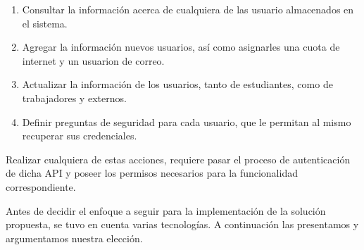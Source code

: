 \begin{enumerate}
	\item Consultar la información acerca de cualquiera de las usuario almacenados en el sistema.
	\item Agregar la información nuevos usuarios, así como asignarles una cuota de internet y un
		usuarion de correo.
	\item Actualizar la información de los usuarios, tanto de estudiantes, como de 
	trabajadores y externos.
	\item Definir preguntas de seguridad para cada usuario, que le permitan al mismo recuperar
		sus credenciales.
\end{enumerate}

Realizar cualquiera de estas acciones, requiere pasar el proceso de autenticación de dicha API
y poseer los permisos necesarios para la funcionalidad correspondiente.

Antes de decidir el enfoque a seguir para la implementación de la solución propuesta, se tuvo en
cuenta varias tecnologías. A continuación las presentamos y argumentamos nuestra elección.





